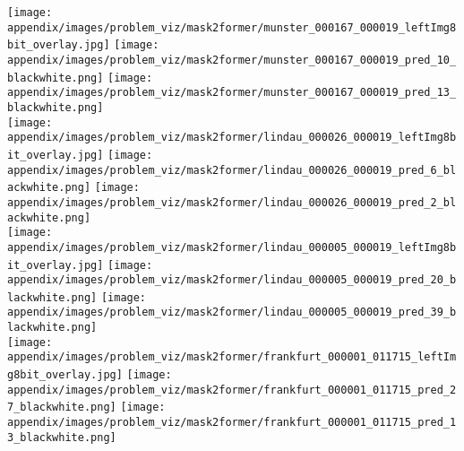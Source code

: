 \documentclass[10pt,twocolumn,letterpaper]{article}
\begin{document}
\begin{figure*}[t]
\centering
\texttt{[image: appendix/images/problem\_viz/mask2former/munster\_000167\_000019\_leftImg8bit\_overlay.jpg]}
\texttt{[image: appendix/images/problem\_viz/mask2former/munster\_000167\_000019\_pred\_10\_blackwhite.png]}
\texttt{[image: appendix/images/problem\_viz/mask2former/munster\_000167\_000019\_pred\_13\_blackwhite.png]}\\

\texttt{[image: appendix/images/problem\_viz/mask2former/lindau\_000026\_000019\_leftImg8bit\_overlay.jpg]}
\texttt{[image: appendix/images/problem\_viz/mask2former/lindau\_000026\_000019\_pred\_6\_blackwhite.png]}
\texttt{[image: appendix/images/problem\_viz/mask2former/lindau\_000026\_000019\_pred\_2\_blackwhite.png]}\\

\texttt{[image: appendix/images/problem\_viz/mask2former/lindau\_000005\_000019\_leftImg8bit\_overlay.jpg]}
\texttt{[image: appendix/images/problem\_viz/mask2former/lindau\_000005\_000019\_pred\_20\_blackwhite.png]}
\texttt{[image: appendix/images/problem\_viz/mask2former/lindau\_000005\_000019\_pred\_39\_blackwhite.png]}\\

\texttt{[image: appendix/images/problem\_viz/mask2former/frankfurt\_000001\_011715\_leftImg8bit\_overlay.jpg]}
\texttt{[image: appendix/images/problem\_viz/mask2former/frankfurt\_000001\_011715\_pred\_27\_blackwhite.png]}
\texttt{[image: appendix/images/problem\_viz/mask2former/frankfurt\_000001\_011715\_pred\_13\_blackwhite.png]}\\


\end{figure*}
\end{document}

